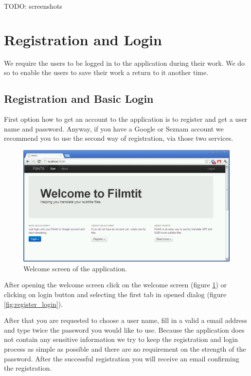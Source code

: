 \label{chap:users_manual}

TODO: screenshots

\section{Registration and Login}

We require the users to be logged in to the application during their work. We do so to enable the users to save their work a return to it another time. 

\subsection{Registration and Basic Login}

First option how to get an account to the application is to register and get a user name and password. Anyway, if you have a Google or Seznam account we recommend you to use the second way of registration, via those two services.

\begin{figure}
\begin{center}
\includegraphics[scale=0.4]{figures/user_manual/welcome_screen.png}
\end{center}
\caption{Welcome screen of the application.}
\label{fig:welcome}
\end{figure}

After opening the welcome screen click on the welcome screen (figure \ref{fig:welcome}) or clicking on login button and selecting the first tab in opened dialog (figure \ref{fig:register_login}).

After that you are requested to choose a user name, fill in a valid a email address and type twice the password you would like to use. Because the application does not contain any sensitive information we try to keep the registration and login process as simple as possible and there are no requirement on the strength of the password. After the successful registration you will receive an email confirming the registration.

